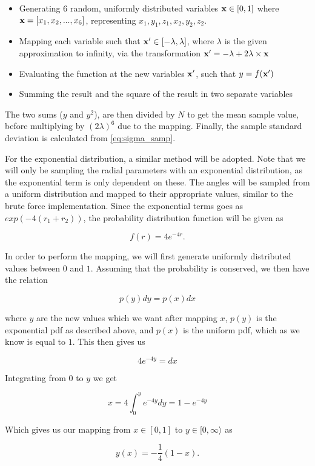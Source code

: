 \documentclass[a4paper,10pt,english]{article}
\begin{document}
\begin{itemize}
    \item Generating 6 random, uniformly distributed variables $\bold{x} \in [0, 1]$ where $\bold{x} = [x_1, x_2, ..., x_6]$, representing $x_1, y_1, z_1, x_2, y_2, z_2$.
    \item Mapping each variable such that $\bold{x}' \in [-\lambda, \lambda]$, where $\lambda$ is the given approximation to infinity, via the transformation $\bold{x}' = -\lambda + 2\lambda \times \bold{x}$
    \item Evaluating the function at the new variables $\bold{x}'$, such that $y = f(\bold{x}')$
    \item Summing the result and the square of the result in two separate variables
\end{itemize}

The two sums ($y$ and $y^2$), are then divided by $N$ to get the mean sample value, before multiplying by $(2\lambda)^6$ due to the mapping. Finally, the sample standard deviation is calculated from \ref{eq:sigma_samp}.

For the exponential distribution, a similar method will be adopted. Note that we will only be sampling the radial parameters with an exponential distribution, as the exponential term is only dependent on these. The angles will be sampled from a uniform distribution and mapped to their appropriate values, similar to the brute force implementation. Since the exponential terms goes as $exp(-4(r_1 + r_2))$, the probability distribution function will be given as

$$f(r) = 4 e^{-4r}.$$

In order to perform the mapping, we will first generate uniformly distributed values between $0$ and $1$. Assuming that the probability is conserved, we then have the relation

$$p(y) dy = p(x) dx$$

where $y$ are the new values which we want after mapping $x$, $p(y)$ is the exponential pdf as described above, and $p(x)$ is the uniform pdf, which as we know is equal to $1$. This then gives us

$$4e^{-4y} = dx$$

Integrating from $0$ to $y$ we get

$$x = 4\int_0^y e^{-4y} dy = 1 - e^{-4y}$$

Which gives us our mapping from $x \in [0, 1]$ to $y \in [0, \infty\rangle$ as 

\begin{equation}\label{eq:expo_map}
    y(x) = -\frac{1}{4}(1 - x).
\end{equation} 
\end{document}
